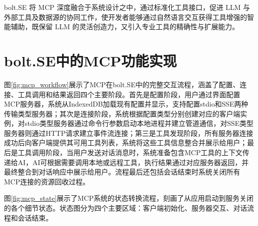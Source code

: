 bolt.SE 将 MCP 深度融合于系统设计之中，通过标准化工具接口，促进 LLM 与外部工具及数据源的协同工作，使开发者能够通过自然语言交互获得工具增强的智能辅助，既保留 LLM 的灵活创造力，又引入专业工具的精确性与扩展能力。

\section{bolt.SE中的MCP功能实现}

图\ref{fig:mcp_workflow}展示了MCP在bolt.SE中的完整交互流程，涵盖了配置、连接、工具调用和结果返回四个主要阶段。首先是配置阶段，用户通过界面配置MCP服务器，系统从IndexedDB加载现有配置并显示，支持配置stdio和SSE两种传输类型服务器；其次是连接阶段，系统根据配置类型分别创建对应的客户端实例，对stdio类型服务器通过命令行参数启动本地进程并建立管道通信，对SSE类型服务器则通过HTTP请求建立事件流连接；第三是工具发现阶段，所有服务器连接成功后向客户端提供其可用工具列表，系统将这些工具信息整合并展示给用户；最后是工具调用阶段，当用户发送对话消息时，系统准备包含MCP工具的上下文传递给AI，AI可根据需要调用本地或远程工具，执行结果通过对应服务器返回，并最终整合到对话响应中展示给用户。流程最后还包括会话结束时系统关闭所有MCP连接的资源回收过程。

图\ref{fig:mcp_state}展示了MCP系统的状态转换流程，刻画了从应用启动到服务关闭的各个细节状态。状态图分为四个主要区域：客户端初始化、服务器交互、对话流程和会话结束。


